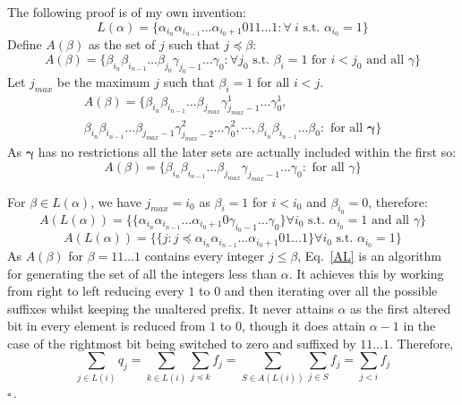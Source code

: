 \documentclass[twoside]{article}
\begin{document}
\noindent
The following proof is of my own invention:
\begin{equation}
L(\alpha) = \{ \alpha_{i_n} \alpha_{i_{n-1}} \ldots \alpha_{i_0 +1} 0 11 \ldots 1: \forall \>i\text{ s.t. } \alpha_{i_0} = 1\}
\end{equation}
Define $A(\beta)$ as the set of $j$ such that $j \preceq \beta$:
\begin{equation}
        A(\beta) = \{ \beta_{i_n} \beta_{i_{n-1}} \ldots \beta_{j_0} \gamma_{j_0 -1} \ldots \gamma_0 : \forall j_0\text{ s.t. } \beta_i = 1\text{ for }i<j_0\text{ and all }\gamma  \}
\end{equation}
Let $j_{max}$ be the maximum $j$ such that $\beta_i = 1$ for all $i<j$.
\begin{multline}
        A(\beta) = \{ \beta_{i_n} \beta_{i_{n-1}} \ldots \beta_{j_{max}} \gamma^1_{j_{max} -1} \ldots \gamma^1_{0},\\  \beta_{i_n} \beta_{i_{n-1}} \ldots \beta_{j_{max}-1} \gamma^2_{j_{max} -2} \ldots \gamma^2_{0}, \cdots,\beta_{i_n} \beta_{i_{n-1}} \ldots \beta_{0}: \text{ for all } \bm \gamma \}
\end{multline}
As $\bm \gamma$ has no restrictions all the later sets are actually included within the first so:
\begin{equation}
        A(\beta) = \{ \beta_{i_n} \beta_{i_{n-1}} \ldots \beta_{j_{max}} \gamma_{j_{max} -1} \ldots \gamma_{0}: \text{ for all }  \gamma \}
\end{equation}

For $\beta \in L(\alpha)$, we have $j_{max} = i_0$ as $\beta_i = 1$ for $i<i_0$ and $\beta_{i_0} = 0$, therefore:
\begin{equation}
        A(L(\alpha)) = \{\{  \alpha_{i_n} \alpha_{i_{n-1}} \ldots \alpha_{i_0+1}0 \gamma_{i_0 -1} \ldots \gamma_{0} \} \forall i_0 \text{ s.t. } \alpha_{i_0} = 1 \text{ and all } \gamma\}
\end{equation}
\begin{equation}
        \label{AL}
A(L(\alpha)) =  \{\{  j: j \preceq \alpha_{i_n} \alpha_{i_{n-1}} \ldots \alpha_{i_0+1}0 1 \ldots 1 \} \forall i_0 \text{ s.t. } \alpha_{i_0} = 1 \}
\end{equation}
As $A(\beta)$ for $\beta = 11\ldots 1$ contains every integer $j \leq \beta$, Eq.~\ref{AL} is an algorithm for generating the set of all the integers less than $\alpha$. It achieves this by working from right to left reducing every $1$ to $0$ and then iterating over all the possible suffixes whilst keeping the unaltered prefix. It never attains $\alpha$ as the first altered bit in every element is reduced from $1$ to $0$, though it does attain $\alpha -1$ in the case of the rightmost bit being switched to zero and suffixed by $11\ldots 1$. Therefore,  
\begin{equation}
        \sum_{j \in L(i)} q_j = \sum_{k \in L(i)} \sum_{j \preceq k} f_j = \sum_{S \in A(L(i))} \sum_{j \in S} f_j = \sum_{j<i} f_j
\end{equation}
 $\square$\,.
 
\end{document}
